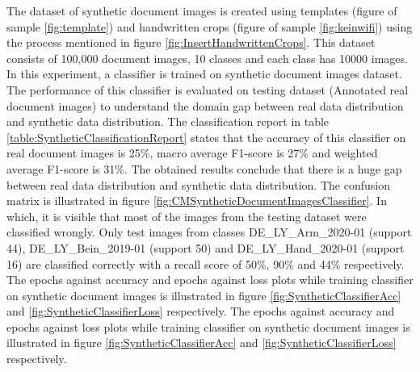 The dataset of synthetic document images is created using templates (figure of sample \ref{fig:template}) and handwritten crops (figure of sample \ref{fig:keinwifi}) using the process mentioned in figure \ref{fig:InsertHandwrittenCrops}. This dataset consists of 100,000 document images, 10 classes and each class has 10000 images. In this experiment, a classifier is trained on synthetic document images dataset. The performance of this classifier is evaluated on testing dataset (Annotated real document images) to understand the domain gap between real data distribution and synthetic data distribution. The classification report in table \ref{table:SyntheticClassificationReport} states that the accuracy of this classifier on real document images is 25\%, macro average F1-score is 27\% and weighted average F1-score is 31\%. The obtained results conclude that there is a huge gap between real data distribution and synthetic data distribution. The confusion matrix is illustrated in figure \ref{fig:CMSyntheticDocumentImagesClassifier}. In which, it is visible that most of the images from the testing dataset were classified wrongly. Only test images from classes DE\_LY\_Arm\_2020-01 (support 44), DE\_LY\_Bein\_2019-01 (support 50) and DE\_LY\_Hand\_2020-01 (support 16) are classified correctly with a recall score of 50\%, 90\% and 44\% respectively. The epochs against accuracy and epochs against loss plots while training classifier on synthetic document images is illustrated in figure \ref{fig:SyntheticClassifierAcc} and \ref{fig:SyntheticClassifierLoss} respectively. The epochs against accuracy and epochs against loss plots while training classifier on synthetic document images is illustrated in figure \ref{fig:SyntheticClassifierAcc} and \ref{fig:SyntheticClassifierLoss} respectively.


